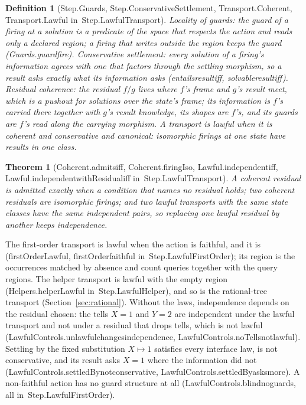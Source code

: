 \documentclass[11pt]{article}
\newtheorem{definition}{Definition}
\newtheorem{theorem}{Theorem}
\theoremstyle{remark}
\newcommand{\lean}[1]{{\ttfamily\def\_{\textunderscore\allowbreak}#1}}
\newcommand{\inmod}[1]{in~{\ttfamily\def\_{\textunderscore\allowbreak}#1}}
\begin{document}
\begin{definition}[\lean{Step.Guards}, \lean{Step.ConservativeSettlement}, \lean{Transport.Coherent}, \lean{Transport.Lawful} \inmod{Step.LawfulTransport}]
\emph{Locality of guards}: the guard of a firing at a solution is a predicate of the space that respects
the action and reads only a declared region; a firing that writes outside the region keeps the guard
(\lean{Guards.guard\_fire}). \emph{Conservative settlement}: every solution of a firing's information agrees
with one that factors through the settling morphism, so a result asks exactly what its information
asks (\lean{entails\_result\_iff}, \lean{solvable\_result\_iff}). \emph{Residual coherence}: the residual $f/g$
lives where $f$'s frame and $g$'s result meet, which is a pushout for solutions over the state's frame;
its information is $f$'s carried there together with $g$'s result knowledge, its shapes are $f$'s, and its
guards are $f$'s read along the carrying morphism. A transport is \emph{lawful} when it is coherent and
conservative and \emph{canonical}: isomorphic firings at one state have results in one class.
\end{definition}

\begin{theorem}[\lean{Coherent.admits\_iff}, \lean{Coherent.firingIso}, \lean{Lawful.independent\_iff}, \lean{Lawful.independent\_withResidual\_iff} \inmod{Step.LawfulTransport}]
A coherent residual is admitted exactly when a condition that names no residual holds; two coherent
residuals are isomorphic firings; and two lawful transports with the same state classes have the same
independent pairs, so replacing one lawful residual by another keeps independence.
\end{theorem}

The first-order transport is lawful when the action is faithful, and it is
(\lean{firstOrderLawful}, \lean{firstOrder\_faithful} \inmod{Step.LawfulFirstOrder}); its region is the
occurrences matched by absence and count queries together with the query regions. The helper transport
is lawful with the empty region (\lean{Helpers.helperLawful} \inmod{Step.LawfulHelper}), and so is the
rational-tree transport (Section~\ref{sec:rational}). Without the laws, independence depends on the
residual chosen: the tells $X=1$ and $Y=2$ are independent under the lawful transport and not under a
residual that drops tells, which is not lawful (\lean{LawfulControls.unlawful\_changes\_independence},
\lean{LawfulControls.noTells\_not\_lawful}). Settling by the fixed substitution $X\mapsto 1$ satisfies every
interface law, is not conservative, and its result asks $X=1$ where the information did not
(\lean{LawfulControls.settledBy\_not\_conservative}, \lean{LawfulControls.settledBy\_asks\_more}). A non-faithful
action has no guard structure at all (\lean{LawfulControls.blind\_no\_guards}, all \inmod{Step.LawfulFirstOrder}).
\end{document}
